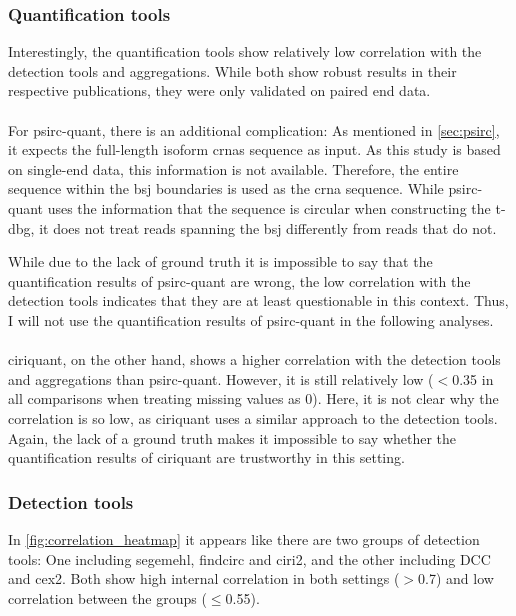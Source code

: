 \subsubsection{Quantification tools}
Interestingly, the quantification tools show relatively low correlation with
the detection tools and aggregations.
While both show robust results in their respective publications, they were only
validated on paired end
data\supercite{zhang_accurate_2020,yu_quantifying_2021}.

\paragraph{}
For \gls{psirc-quant}, there is an additional complication: As mentioned in
\cref{sec:psirc}, it expects the full-length isoform \glspl{crna} sequence as
input.
As this study is based on single-end data, this information is not available.
Therefore, the entire sequence within the \gls{bsj} boundaries is used as the
\gls{crna} sequence.
While \gls{psirc-quant} uses the information that the sequence is circular when
constructing the \gls{t-dbg}, it does not treat reads spanning the \gls{bsj}
differently from reads that do not\supercite{yu_quantifying_2021}.

While due to the lack of ground truth it is impossible to say that the
quantification results of \gls{psirc-quant} are wrong, the low correlation with
the detection tools indicates that they are at least questionable in this
context.
Thus, I will not use the quantification results of \gls{psirc-quant} in the
following analyses.

\paragraph{}
\Gls{ciriquant}, on the other hand, shows a higher correlation with
the detection tools and aggregations than \gls{psirc-quant}.
However, it is still relatively low ($<$0.35 in all comparisons when treating
missing values as 0).
Here, it is not clear why the correlation is so low, as \gls{ciriquant} uses a
similar approach to the detection tools.
Again, the lack of a ground truth makes it impossible to say whether the
quantification results of \gls{ciriquant} are trustworthy in this setting.

\subsubsection{Detection tools}
In \cref{fig:correlation_heatmap} it appears like there are two groups of
detection tools: One including \gls{segemehl}, \gls{findcirc} and \gls{ciri2},
and the other including DCC and \gls{cex2}.
Both show high internal correlation in both settings ($>$0.7) and low
correlation between the groups ($\leq$0.55).

